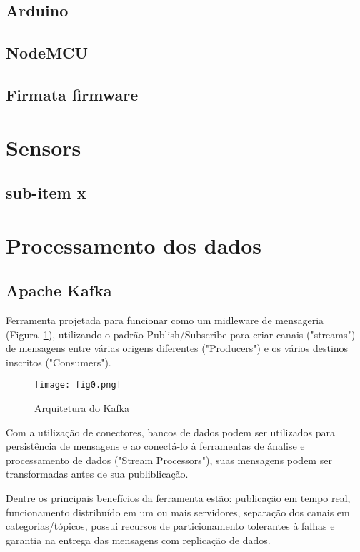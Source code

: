 		\subsection{Arduino}
		\subsection{NodeMCU}
		\subsection{Firmata firmware}
	\section{Sensors}
	\subsection{sub-item x}
	\section{Processamento dos dados}
		\subsection{Apache Kafka}
		Ferramenta projetada para funcionar como um midleware de mensageria (Figura~\ref{fig:arqkafka}), utilizando o padr\~ao Publish/Subscribe para criar canais ("streams") de mensagens entre v\'arias origens diferentes ("Producers") e os v\'arios destinos inscritos ("Consumers").
		
		\begin{figure}[ht]
			\centering
			\texttt{[image: fig0.png]}
			\caption{Arquitetura do Kafka}
			\label{fig:arqkafka}
		\end{figure}
		
		Com a utiliza\c{c}\~ao de conectores, bancos de dados podem ser utilizados para persist\^encia de mensagens e ao conect\'a-lo à ferramentas de \'analise e processamento de dados ("Stream Processors"), suas mensagens podem ser transformadas antes de sua publiblica\c{c}\~ao.
		
		Dentre os principais benef\'icios da ferramenta est\~ao: publica\c{c}\~ao em tempo real, funcionamento distribu\'ido em um ou mais servidores, separa\c{c}\~ao dos canais em categorias/t\'opicos, possui recursos de particionamento tolerantes à falhas e garantia na entrega das mensagens com replica\c{c}\~ao de dados. 
		
